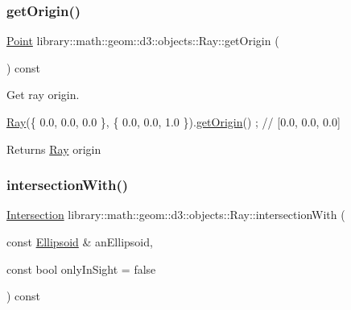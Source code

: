 \subsubsection{\texorpdfstring{get\+Origin()}{getOrigin()}}
{\footnotesize\ttfamily \hyperlink{classlibrary_1_1math_1_1geom_1_1d3_1_1objects_1_1_point}{Point} library\+::math\+::geom\+::d3\+::objects\+::\+Ray\+::get\+Origin (\begin{DoxyParamCaption}{ }\end{DoxyParamCaption}) const}



Get ray origin. 


\begin{DoxyCode}
\hyperlink{classlibrary_1_1math_1_1geom_1_1d3_1_1objects_1_1_ray_a11b7613464daaebc6e25a758b057f203}{Ray}(\{ 0.0, 0.0, 0.0 \}, \{ 0.0, 0.0, 1.0 \}).\hyperlink{classlibrary_1_1math_1_1geom_1_1d3_1_1objects_1_1_ray_abaac9b7fcc10e2076ada11f2798386bd}{getOrigin}() ; \textcolor{comment}{// [0.0, 0.0, 0.0]}
\end{DoxyCode}


\begin{DoxyReturn}{Returns}
\hyperlink{classlibrary_1_1math_1_1geom_1_1d3_1_1objects_1_1_ray}{Ray} origin 
\end{DoxyReturn}
\mbox{\label{classlibrary_1_1math_1_1geom_1_1d3_1_1objects_1_1_ray_aea1460113fed4868d652c5f3bd7a9422}} 
\subsubsection{\texorpdfstring{intersection\+With()}{intersectionWith()}}
{\footnotesize\ttfamily \hyperlink{classlibrary_1_1math_1_1geom_1_1d3_1_1_intersection}{Intersection} library\+::math\+::geom\+::d3\+::objects\+::\+Ray\+::intersection\+With (\begin{DoxyParamCaption}\item[{const \hyperlink{classlibrary_1_1math_1_1geom_1_1d3_1_1objects_1_1_ellipsoid}{Ellipsoid} \&}]{an\+Ellipsoid,  }\item[{const bool}]{only\+In\+Sight = {\ttfamily false} }\end{DoxyParamCaption}) const}



